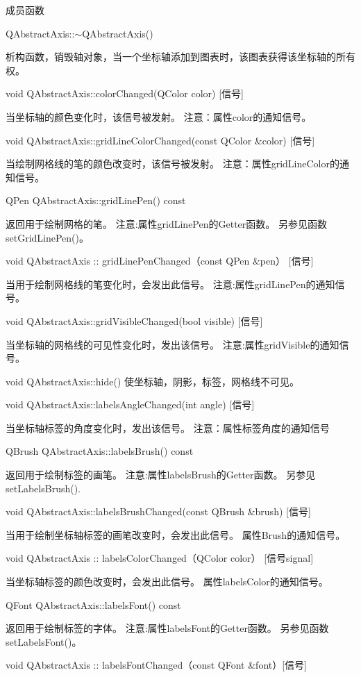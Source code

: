 成员函数

QAbstractAxis::$\sim$QAbstractAxis() 

析构函数，销毁轴对象，当一个坐标轴添加到图表时，该图表获得该坐标轴的所有权。

void QAbstractAxis::colorChanged(QColor color) [信号] 

当坐标轴的颜色变化时，该信号被发射。 注意：属性color的通知信号。

void QAbstractAxis::gridLineColorChanged(const QColor \&color) [信号] 

当绘制网格线的笔的颜色改变时，该信号被发射。 注意：属性gridLineColor的通知信号。

QPen QAbstractAxis::gridLinePen() const

 返回用于绘制网格的笔。 注意:属性gridLinePen的Getter函数。 另参见函数setGridLinePen()。

void QAbstractAxis :: gridLinePenChanged（const QPen \&pen） [信号] 

当用于绘制网格线的笔变化时，会发出此信号。 注意:属性gridLinePen的通知信号。

void QAbstractAxis::gridVisibleChanged(bool visible) [信号] 

当坐标轴的网格线的可见性变化时，发出该信号。 注意:属性gridVisible的通知信号。

void QAbstractAxis::hide() 使坐标轴，阴影，标签，网格线不可见。

void QAbstractAxis::labelsAngleChanged(int angle) [信号]

 当坐标轴标签的角度变化时，发出该信号。 注意：属性标签角度的通知信号

QBrush QAbstractAxis::labelsBrush() const 

返回用于绘制标签的画笔。 注意:属性labelsBrush的Getter函数。 另参见setLabelsBrush().

void QAbstractAxis::labelsBrushChanged(const QBrush \&brush) [信号] 

当用于绘制坐标轴标签的画笔改变时，会发出此信号。 属性Brush的通知信号。

void QAbstractAxis :: labelsColorChanged（QColor color） [信号signal] 

当坐标轴标签的颜色改变时，会发出此信号。 属性labelsColor的通知信号。

QFont QAbstractAxis::labelsFont() const 

返回用于绘制标签的字体。 注意:属性labelsFont的Getter函数。 另参见函数setLabelsFont()。

void QAbstractAxis :: labelsFontChanged（const QFont \&font）[信号] 

